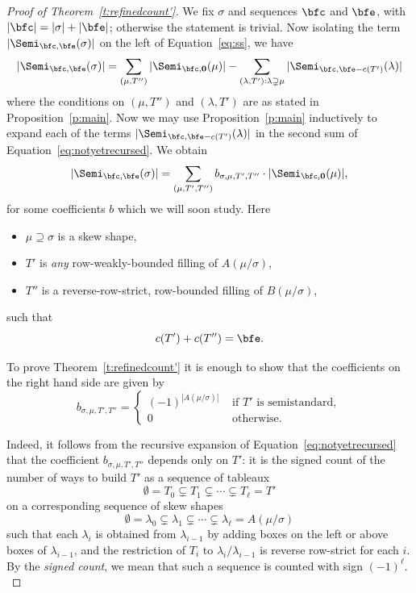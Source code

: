 \begin{proof}[Proof of Theorem~\ref{t:refinedcount'}] 
We fix $\sigma$ and sequences $\bfc$ and $\bfe$, with $|\bfc| = |\sigma| + |\bfe|$; otherwise the statement is trivial. Now isolating the term $|\Semi_{\bfc, \bfe}(\sigma)|$ on the left of Equation~\eqref{eq:ss}, we have
\begin{equation}\label{eq:notyetrecursed}
|\Semi_{\bfc, \bfe}(\sigma)| = \sum_{(\mu,T'')} |\Semi_{\bfc, \mathbf{0}}(\mu)| - \sum_{(\lambda, T'): \lambda\supsetneq \mu } |\Semi_{\bfc, \bfe-c(T')}(\lambda)|
\end{equation}
where the conditions on $(\mu,T'')$ and $(\lambda,T')$ are as stated in Proposition~\ref{p:main}. Now we may use Proposition~\ref{p:main} inductively to expand each of the terms $|\Semi_{\bfc, \bfe-c(T')}(\lambda)|$ in the second sum of Equation~\eqref{eq:notyetrecursed}. We obtain
\begin{equation}\label{eq:nowrecursed}
|\Semi_{\bfc, \bfe}(\sigma)| = \sum_{(\mu,T',T'')} b_{\sigma,\mu,T',T''} \cdot |\Semi_{\bfc, \mathbf{0}}(\mu)|,
\end{equation}
 for some coefficients $b$ which we will soon study. Here
\begin{itemize}
\item $\mu\supseteq \sigma$ is a skew shape,
\item $T'$ is \emph{any} row-weakly-bounded filling of $A(\mu/\sigma)$, 
\item $T''$ is a reverse-row-strict, row-bounded filling of $B(\mu/\sigma)$,
\end{itemize}
such that
\[
c(T') + c(T'') = \bfe.
\]

To prove Theorem~\ref{t:refinedcount'} it is enough to show that the coefficients on the right hand side are given by
\[
b_{\sigma,\mu,T',T''} = \begin{cases}
(-1)^{|A(\mu/\sigma)|} &\text{ if $T'$ is semistandard}, \\ 
0 & \text{ otherwise.}
\end{cases}
\]

Indeed, it follows from the recursive expansion of Equation~\eqref{eq:notyetrecursed} that the coefficient $b_{\sigma,\mu,T',T''}$ depends only on $T'$: it is
the signed count of the number of ways to build $T'$ as a sequence of tableaux
\[
\emptyset = T_0 \subsetneq T_1 \subsetneq \cdots \subsetneq T_\ell = T'
\]
on a corresponding sequence of skew shapes
\[
\emptyset = \lambda_0 \subsetneq \lambda_1 \subsetneq \cdots \subsetneq \lambda_\ell = A(\mu/\sigma)\]
 such that each $\lambda_i$ is obtained from $\lambda_{i-1}$ by adding boxes on the left or above boxes of $\lambda_{i-1}$, and the restriction of $T_i$ to $\lambda_i/\lambda_{i-1}$ is reverse row-strict for each $i$. By the \emph{signed count}, we mean that such a sequence is counted with sign $(-1)^\ell.$ 


\end{proof}
